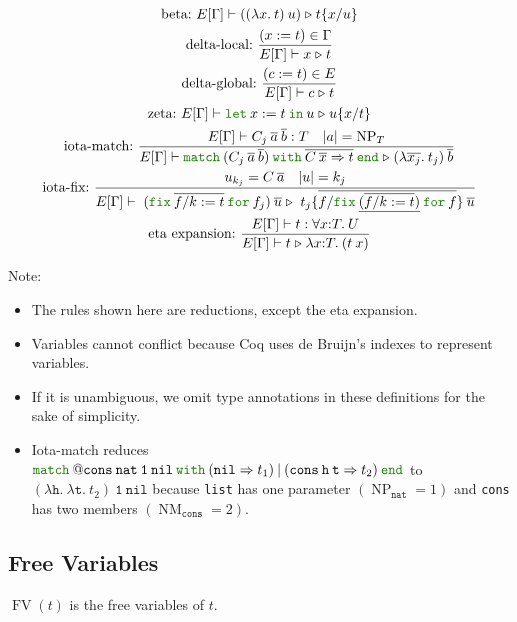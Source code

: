 \documentclass[a4paper,fleqn]{article}
\def\coq{\textrm{Coq}}
\newcommand{\kwlet}{\mbox{\color{mygreen}\ttfamily let}}
\newcommand{\kwin}{\mbox{\color{mygreen}\ttfamily in}}
\newcommand{\kwmatch}{\mbox{\color{mygreen}\ttfamily match}}
\newcommand{\kwwith}{\mbox{\color{mygreen}\ttfamily with}}
\newcommand{\kwend}{\mbox{\color{mygreen}\ttfamily end}}
\newcommand{\kwfix}{\mbox{\color{mygreen}\ttfamily fix}}
\newcommand{\kwfor}{\mbox{\color{mygreen}\ttfamily for}}
\newcommand{\lam}[2]{\lambda #1.\:#2}
\newcommand{\lamT}[3]{\lambda #1\mathord{:}#2.\:#3}
\newcommand{\prodT}[3]{\forall #1\mathord{:}#2.\:#3}
\newcommand{\letin}[3]{\kwlet\:#1:=#2\:\kwin\:#3}
\newcommand{\omatch}[2]{\kwmatch\:#1\:\kwwith\:{#2}\:\kwend}
\newcommand{\ofix}[2]{\kwfix\:{#1}\:\kwfor\:{#2}}
\DeclareMathOperator{\NP}{NP} %
\DeclareMathOperator{\NM}{NM} %
\DeclareMathOperator{\FV}{FV}
\newcommand{\WT}[4]{\ensuremath{#1[#2] \vdash #3 : #4}}
\newcommand{\WTE}[3]{\WT{E}{#1}{#2}{#3}}
\newcommand{\WTEG}[2]{\WTE{\Gamma}{#1}{#2}}
\newcommand{\subst}[3]{#1\{#2/#3\}}
\newcommand{\substm}[3]{#1\{\overline{#2/#3}\}}
\newcommand{\reltri}{\mathrel{\triangleright}}
\newcommand{\rep}[1]{\overline{#1}}
\begin{document}
\begin{gather*}
  \text{beta:}~
    E[\Gamma] \vdash ((\lam{x}{t})\:u) \reltri \subst{t}{x}{u} \\
  \text{delta-local:}~
    \dfrac{(x:=t) \in \Gamma}{E[\Gamma] \vdash x \reltri t} \\
  \text{delta-global:}~
    \dfrac{(c:=t) \in E}{E[\Gamma] \vdash c \reltri t} \\
  \text{zeta:}~
    E[\Gamma] \vdash \letin{x}{t}{u} \reltri \subst{u}{x}{t} \\
  \text{iota-match:}~
    \dfrac
    {
      E[\Gamma] \vdash C_j\:\rep{a}\:\rep{b} : T \quad
      \text{$|a| = \NP_T$}
    }{
      E[\Gamma] \vdash
      \omatch{(C_j\:\rep{a}\:\rep{b})}{\rep{C\:\rep{x}\Rightarrow t}}
      \reltri
      (\lam{\rep{x_j}}{t_j})\:\rep{b}
    } \\
  \text{iota-fix:}~
    \dfrac{
      u_{k_j} = C\:\rep{a} \quad
      |u| = k_j
    }{
      E[\Gamma] \vdash\; (\ofix{\rep{f/k:=t}}{f_j})\:\rep{u} \reltri\; \substm{t_j}{f}{\ofix{\underline{(\rep{f/k:=t})}}{f}} \: \rep{u}
    } \\
  \text{eta expansion:}~
    \dfrac{\WTEG{t}{\prodT{x}{T}{U}}}{E[\Gamma] \vdash t \reltri \lamT{x}{T}{(t\:x)}}
\end{gather*}
{\small Note:
\begin{itemize}
  \item The rules shown here are reductions, except the eta expansion.
  \item Variables cannot conflict because \coq{} uses de Bruijn's indexes to represent variables.
  \item If it is unambiguous, we omit type annotations in these definitions for the sake of simplicity.
  \item Iota-match reduces $\kwmatch\:\mathtt{@cons\:nat\:1\:nil}\:\kwwith\:(\mathtt{nil} \Rightarrow t_1)\:|\:(\mathtt{cons}\:\mathtt{h}\:\mathtt{t} \Rightarrow t_2)\:\kwend$ to $(\lam{\mathtt{h}}{\lam{\mathtt{t}}{t_2}})\:\mathtt{1\:nil}$
    because \lstinline!list! has one parameter $(\NP_\mathtt{nat}=1)$ and \lstinline!cons! has two members $(\NM_\mathtt{cons}=2)$.
\end{itemize}}

\subsection{Free Variables}

$\FV(t)$ is the free variables of $t$.
\end{document}
